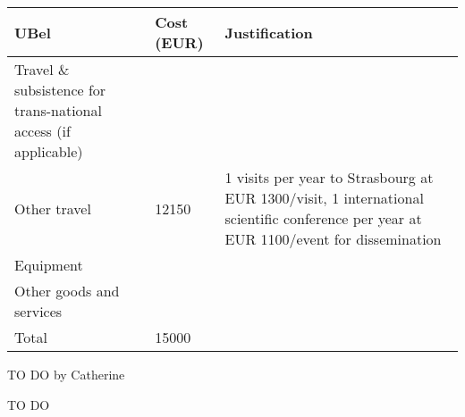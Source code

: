 \begin{center}
\begin{tabular}{|p{9em}|l|p{}|}
\hline
  UBel & Cost (EUR)  & Justification \\
  \hline
  Travel \& subsistence for trans-national access (if applicable) & & \\
  \hline
  Other travel & 12150 & 1 visits per year to Strasbourg at EUR 1300/visit,
  1 international scientific conference per year at EUR 1100/event for
  dissemination \\
  \hline
  Equipment & & \\
  \hline
  Other goods and services & & \\
  \hline
  \hline
  Total & 15000 & \\
  \hline
\end{tabular}
\end{center}


{\color{red} TO DO by Catherine}


{\color{red} TO DO}




